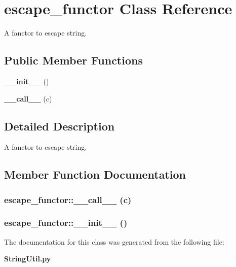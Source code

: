 \section{escape\_\-functor Class Reference}
\label{classescape__functor}
A fanctor to escape string.  


\subsection*{Public Member Functions}
\begin{CompactItemize}
\item 
{\bf \_\-\_\-init\_\-\_\-} ()
\item 
{\bf \_\-\_\-call\_\-\_\-} (c)
\end{CompactItemize}


\subsection{Detailed Description}
A fanctor to escape string. 



\subsection{Member Function Documentation}
\subsubsection{\setlength{\rightskip}{0pt plus 5cm}escape\_\-functor::\_\-\_\-call\_\-\_\- (c)}\label{classescape__functor_escape__functora1}


\subsubsection{\setlength{\rightskip}{0pt plus 5cm}escape\_\-functor::\_\-\_\-init\_\-\_\- ()}\label{classescape__functor_escape__functora0}




The documentation for this class was generated from the following file:\begin{CompactItemize}
\item 
{\bf String\-Util.py}\end{CompactItemize}
